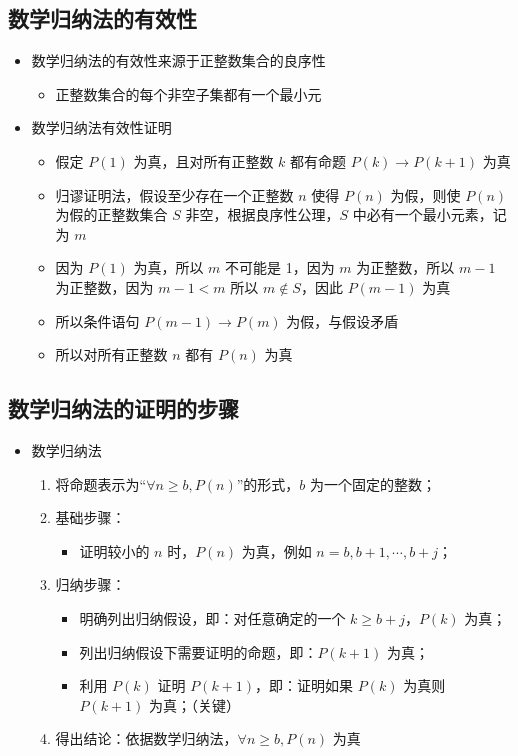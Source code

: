 \documentclass[UTF8]{report}
\theoremstyle{MyLineTheoremStyle} %
\theoremstyle{MyBlockTheoremStyle} %
\theoremstyle{MySubsubsectionStyle} %
\begin{document}
\subsection{数学归纳法的有效性}
\begin{itemize}
    \item 数学归纳法的有效性来源于正整数集合的良序性
    \begin{itemize}
        \item 正整数集合的每个非空子集都有一个最小元
    \end{itemize}
    \item 数学归纳法有效性证明
    \begin{itemize}
        \item 假定 $P(1)$ 为真，且对所有正整数 $k$ 都有命题 $P(k) \rightarrow P(k+1)$ 为真
        \item 归谬证明法，假设至少存在一个正整数 $n$ 使得 $P(n)$ 为假，则使 $P(n)$ 为假的正整数集合 $S$ 非空，根据良序性公理，$S$ 中必有一个最小元素，记为 $m$
        \item 因为 $P(1)$ 为真，所以 $m$ 不可能是 1，因为 $m$ 为正整数，所以 $m-1$ 为正整数，因为 $m-1 < m$ 所以 $m \notin S$，因此 $P(m-1)$ 为真
        \item 所以条件语句 $P(m-1) \rightarrow P(m)$ 为假，与假设矛盾
        \item 所以对所有正整数 $n$ 都有 $P(n)$ 为真
    \end{itemize}
\end{itemize}

\subsection{数学归纳法的证明的步骤}
\begin{itemize}
    \item 数学归纳法
    \begin{enumerate}
        \item 将命题表示为“$\forall n \geq b, P(n)$”的形式，$b$ 为一个固定的整数；
        \item 基础步骤：
        \begin{itemize}
            \item 证明较小的 $n$ 时，$P(n)$ 为真，例如 $n = b, b+1, \cdots, b+j$；
        \end{itemize}
        \item 归纳步骤：
        \begin{itemize}
            \item 明确列出归纳假设，即：对任意确定的一个 $k \geq b+j$，$P(k)$ 为真；
            \item 列出归纳假设下需要证明的命题，即：$P(k+1)$ 为真；
            \item 利用 $P(k)$ 证明 $P(k+1)$，即：证明如果 $P(k)$ 为真则 $P(k+1)$ 为真；（关键）
        \end{itemize}
        \item 得出结论：依据数学归纳法，$\forall n \geq b, P(n)$ 为真
    \end{enumerate}
\end{itemize}
\end{document}
